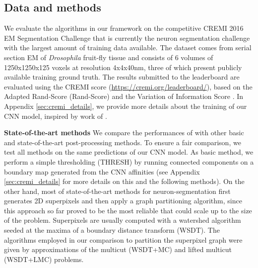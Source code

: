 

\subsection{Data and methods} \label{sec:cremi_challenge}
We evaluate the algorithms in our framework on the competitive CREMI 2016 EM Segmentation Challenge \cite{cremiChallenge} that is currently the neuron segmentation challenge with the largest amount of training data available. The dataset comes from serial section EM of \emph{Drosophila} fruit-fly tissue and consists of 6 volumes of 1250x1250x125 voxels at resolution 4x4x40nm, three of which present publicly available training ground truth. The results submitted to the leaderboard are evaluated using the CREMI score (\url{https://cremi.org/leaderboard/}), based on the Adapted Rand-Score (Rand-Score) and the Variation of Information Score \cite{arganda2015crowdsourcing}. In Appendix \ref{sec:cremi_details}, we provide more details about the training of our CNN model, inspired by work of \cite{lee2017superhuman,funke2018large}.


\textbf{State-of-the-art methods } We compare the performances of \algname{} with other basic and state-of-the-art post-processing methods. To ensure a fair comparison, we test all methods on the same predictions of our CNN model. As basic method, we perform a simple thresholding (THRESH) by running connected components on a boundary map generated from the CNN affinities (see Appendix \ref{sec:cremi_details} for more details on this and the following methods). On the other hand, most of state-of-the-art methods for neuron-segmentation first generates 2D superpixels and then apply a graph partitioning algorithm, since this approach so far proved to be the most reliable that could scale up to the size of the problem. Superpixels are usually computed with a watershed algorithm seeded at the maxima of a boundary distance transform (WSDT). The algorithms employed in our comparison to partition the superpixel graph were given by approximations of the multicut (WSDT+MC) and lifted multicut (WSDT+LMC) problems.


